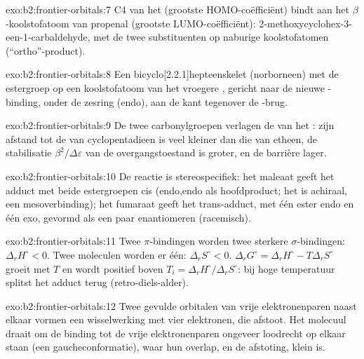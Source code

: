 \begin{solution}{exo:b2:frontier-orbitals:7}
C4 van het  (grootste HOMO-coëfficiënt) bindt aan het $\beta$-koolstofatoom van propenal (grootste
LUMO-coëfficiënt): 2-methoxycyclohex-3-een-1-carbaldehyde, met de twee substituenten op
naburige koolstofatomen (``ortho''-product).
\end{solution}

\begin{solution}{exo:b2:frontier-orbitals:8}
Een bicyclo[2.2.1]hepteenskelet (norborneen) met de estergroep op een koolstofatoom van het
vroegere , gericht naar de nieuwe -binding, onder de zesring
(endo), aan de kant tegenover de -brug.
\end{solution}

\begin{solution}{exo:b2:frontier-orbitals:9}
De twee carbonylgroepen verlagen de  van het : zijn afstand tot de  van
cyclopentadieen is veel kleiner dan die van etheen, de stabilisatie $\beta^2/\Delta\varepsilon$ van
de overgangstoestand is groter, en de barrière lager.
\end{solution}

\begin{solution}{exo:b2:frontier-orbitals:10}
De reactie is stereospecifiek: het maleaat geeft het adduct met beide estergroepen cis
(endo,endo als hoofdproduct; het is achiraal, een mesoverbinding); het fumaraat geeft het
trans-adduct, met één ester endo en één exo, gevormd als een paar enantiomeren (racemisch).
\end{solution}

\begin{solution}{exo:b2:frontier-orbitals:11}
Twee $\pi$-bindingen worden twee sterkere $\sigma$-bindingen: $\Delta_r H^\circ < 0$. Twee moleculen worden er één:
$\Delta_r S^\circ < 0$. $\Delta_r G^\circ = \Delta_r H^\circ - T\Delta_r S^\circ$ groeit met $T$ en wordt
positief boven $T_i = \Delta_r H^\circ/\Delta_r S^\circ$: bij hoge temperatuur splitst het adduct terug
(retro-diels-alder).
\end{solution}

\begin{solution}{exo:b2:frontier-orbitals:12}
Twee gevulde orbitalen van vrije elektronenparen naast elkaar vormen een wisselwerking met vier elektronen, die
afstoot. Het molecuul draait om de binding  tot de vrije elektronenparen ongeveer
loodrecht op elkaar staan (een gaucheconformatie), waar hun overlap, en de afstoting,
klein is.
\end{solution}

